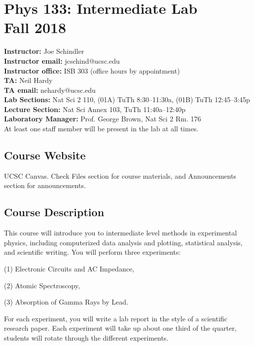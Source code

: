 \documentclass[10pt]{article}
\begin{document}
\section*{\centering Phys 133: Intermediate Lab \\ Fall 2018}

\noindent
\textbf{Instructor:} Joe Schindler \\
\textbf{Instructor email:} jcschind@ucsc.edu \\ 
\textbf{Instructor office:} ISB 303 (office hours by appointment) \\
\textbf{TA:}  Neil Hardy \\
\textbf{TA email:} nehardy@ucsc.edu \\
\textbf{Lab Sections:} Nat Sci 2 110, (01A) TuTh 8:30--11:30a, (01B) TuTh 12:45--3:45p\\
\textbf{Lecture Section:} Nat Sci Annex 103, TuTh 11:40a--12:40p\\
\textbf{Laboratory Manager:} Prof. George Brown, Nat Sci 2 Rm. 176 \\

\noindent At least one staff member will be present in the lab at all times.

\subsection*{Course Website}

UCSC Canvas. Check Files section for course materials, and Announcements section for announcements.

\subsection*{Course Description}

This course will introduce you to intermediate level methods in experimental physics, including computerized data analysis and plotting, statistical analysis, and scientific writing. You will perform three experiments:

(1) Electronic Circuits and AC Impedance,

(2) Atomic Spectroscopy,

(3) Absorption of Gamma Rays by Lead.

\noindent
For each experiment, you will write a lab report in the style of a scientific research paper. Each experiment will take up about one third of the quarter, students will rotate through the different experiments.
\end{document}
